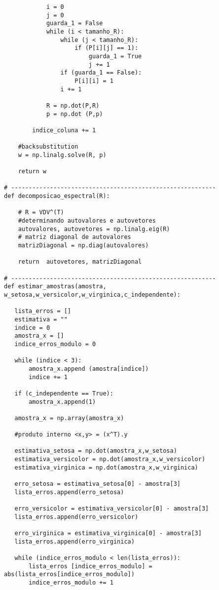 \documentclass[a4paper,12pt,twoside]{article}
\begin{document}
\begin{lstlisting}
            i = 0
            j = 0
            guarda_1 = False
            while (i < tamanho_R):
                while (j < tamanho_R):
                    if (P[i][j] == 1):
                        guarda_1 = True
                        j += 1
                if (guarda_1 == False):
                    P[i][i] = 1
                i += 1
            
            R = np.dot(P,R)
            p = np.dot (P,p)
       
        indice_coluna += 1 
    
    #backsubstitution
    w = np.linalg.solve(R, p)
      
    return w
           
# ----------------------------------------------------------
def decomposicao_espectral(R):
    
    # R = VDV^(T)
    #determinando autovalores e autovetores
    autovalores, autovetores = np.linalg.eig(R) 
    # matriz diagonal de autovalores
    matrizDiagonal = np.diag(autovalores) 
    
    return  autovetores, matrizDiagonal

# ----------------------------------------------------------
def estimar_amostras(amostra, w_setosa,w_versicolor,w_virginica,c_independente):
    
   lista_erros = []
   estimativa = ""
   indice = 0
   amostra_x = []
   indice_erros_modulo = 0
   
   while (indice < 3):
       amostra_x.append (amostra[indice])
       indice += 1
       
   if (c_independente == True):
       amostra_x.append(1)
      
   amostra_x = np.array(amostra_x)
   
   #produto interno <x,y> = (x^T).y
   
   estimativa_setosa = np.dot(amostra_x,w_setosa)
   estimativa_versicolor = np.dot(amostra_x,w_versicolor)
   estimativa_virginica = np.dot(amostra_x,w_virginica)
   
   erro_setosa = estimativa_setosa[0] - amostra[3]
   lista_erros.append(erro_setosa)
   
   erro_versicolor = estimativa_versicolor[0] - amostra[3]
   lista_erros.append(erro_versicolor)
   
   erro_virginica = estimativa_virginica[0] - amostra[3]
   lista_erros.append(erro_virginica)
   
   while (indice_erros_modulo < len(lista_erros)):
       lista_erros [indice_erros_modulo] = abs(lista_erros[indice_erros_modulo])
       indice_erros_modulo += 1
   

\end{lstlisting}
\end{document}
